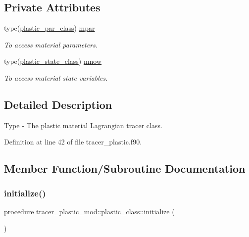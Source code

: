 \subsection*{Private Attributes}
\begin{DoxyCompactItemize}
\item 
type(\mbox{\hyperlink{structtracer__plastic__mod_1_1plastic__par__class}{plastic\+\_\+par\+\_\+class}}) \mbox{\hyperlink{structtracer__plastic__mod_1_1plastic__class_ae1a94a8bd2796aa13dfa820845f56563}{mpar}}
\begin{DoxyCompactList}\small\item\em To access material parameters. \end{DoxyCompactList}\item 
type(\mbox{\hyperlink{structtracer__plastic__mod_1_1plastic__state__class}{plastic\+\_\+state\+\_\+class}}) \mbox{\hyperlink{structtracer__plastic__mod_1_1plastic__class_ae30b971a131c8203026a7631dff3a51f}{mnow}}
\begin{DoxyCompactList}\small\item\em To access material state variables. \end{DoxyCompactList}\end{DoxyCompactItemize}


\subsection{Detailed Description}
Type -\/ The plastic material Lagrangian tracer class. 

Definition at line 42 of file tracer\+\_\+plastic.\+f90.



\subsection{Member Function/\+Subroutine Documentation}
\mbox{\label{structtracer__plastic__mod_1_1plastic__class_af0274af24d9d0dab89751456a0ef83bb}} 
\subsubsection{\texorpdfstring{initialize()}{initialize()}}
{\footnotesize\ttfamily procedure tracer\+\_\+plastic\+\_\+mod\+::plastic\+\_\+class\+::initialize (\begin{DoxyParamCaption}{ }\end{DoxyParamCaption})\hspace{0.3cm}{\ttfamily [private]}}



